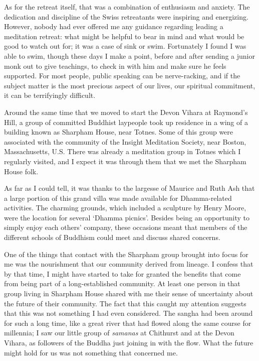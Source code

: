 As for the retreat itself, that was a combination of enthusiasm and
anxiety. The dedication and discipline of the Swiss retreatants were
inspiring and energizing. However, nobody had ever offered me any
guidance regarding leading a meditation retreat: what might be helpful
to bear in mind and what would be good to watch out for; it was a case
of sink or swim. Fortunately I found I was able to swim, though these
days I make a point, before and after sending a junior monk out to give
teachings, to check in with him and make sure he feels supported. For
most people, public speaking can be nerve-racking, and if the subject
matter is the most precious aspect of our lives, our spiritual
commitment, it can be terrifyingly difficult.

Around the same time that we moved to start the Devon Vihara at Raymond’s Hill, a group of
committed Buddhist laypeople took up residence in a wing of a building
known as Sharpham House\cite{sharpham}, near Totnes.
Some of this group were associated with
the community of the Insight Meditation Society, near Boston,
Massachusetts, U.S. There was already a meditation group in Totnes which
I regularly visited, and I expect it was through them that we met the
Sharpham House folk.

As far as I could tell, it was thanks to the largesse of Maurice and
Ruth Ash that a large portion of this grand villa was made available for
Dhamma-related activities. The charming grounds, which included a
sculpture by Henry Moore, were the location for several `Dhamma
picnics'. Besides being an opportunity to simply enjoy each others'
company, these occasions meant that members of the different schools of
Buddhism could meet and discuss shared concerns.

One of the things that contact with the Sharpham group brought into
focus for me was the nourishment that our community derived from
lineage. I confess that by that time, I might have started to take for
granted the benefits that come from being part of a long-established
community. At least one person in that group living in Sharpham House
shared with me their sense of uncertainty about the future of their
community. The fact that this caught my attention suggests that this was
not something I had even considered. The sangha had been around for such
a long time, like a great river that had flowed along the same course
for millennia; I saw our little group of \emph{samanas} at Chithurst and
at the Devon Vihara, as followers of the Buddha just joining in with the
flow. What the future might hold for us was not something that concerned
me.


